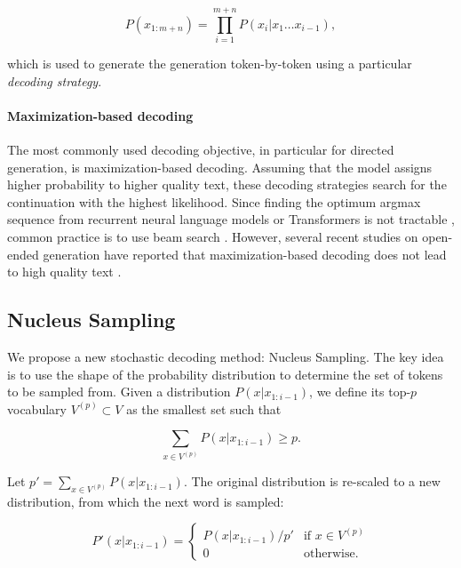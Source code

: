 \begin{equation}
    P(x_{1:m+n}) = \prod_{i=1}^{m+n} P(x_i | x_1 \ldots x_{i-1}),
\end{equation}

which is used to generate the generation token-by-token using a particular \emph{decoding strategy}.

\paragraph{Maximization-based decoding} The most commonly used decoding objective, in particular for directed generation, is maximization-based decoding. Assuming that the model assigns higher probability to higher quality text, these decoding strategies search for the continuation with the highest likelihood. Since finding the optimum argmax sequence from recurrent neural language models or Transformers is not tractable \citep{chen-etal-2018-recurrent}, common practice is to use beam search \citep{li2016deep,shen2017style,wiseman2017challenges}. However, several recent studies on open-ended generation have reported that maximization-based decoding does not lead to high quality text \citep{fan2018hierarchical, holtzman2018l2w}.

\subsection{Nucleus Sampling}
\label{ssec:nucleus}

We propose a new stochastic decoding method: Nucleus Sampling. The key idea is to use the shape of the probability distribution to determine the set of tokens to be sampled from. Given a distribution $P(x | x_{1:i-1})$, we define its top-$p$ vocabulary $V^{(p)} \subset V$ as the smallest set such that

\begin{equation}
    \sum_{x \in V^{(p)}} P(x | x_{1:i-1}) \geq p.
\end{equation}

Let $p' = \sum_{x \in V^{(p)}} P(x | x_{1:i-1})$. The original distribution is re-scaled to a new distribution, from which the next word is sampled:

\begin{equation}
  P'(x | x_{1:i-1}) = \left\{ 
    \begin{array}{ll}
    P(x | x_{1:i-1})/p' & \mbox{if } x \in V^{(p)} \\
    0 & \mbox{otherwise.}
    \end{array}
    \right. \label{eq:rescale}
\end{equation}

